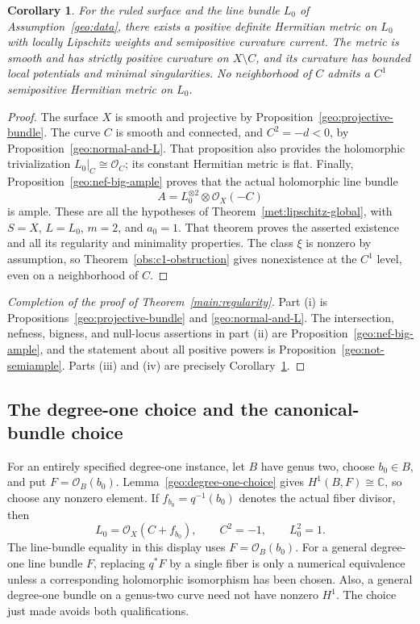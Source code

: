 \documentclass[11pt,a4paper]{article}
\numberwithin{equation}{section}
\newtheorem{corollary}[theorem]{Corollary}
\theoremstyle{definition}
\theoremstyle{remark}
\newcommand{\C}{\mathbb C}
\newcommand{\OO}{\mathcal O}
\begin{document}
\begin{corollary}\label{con:application}
For the ruled surface and the line bundle $L_0$ of
Assumption~\ref{geo:data}, there exists a positive definite Hermitian metric
on $L_0$ with locally Lipschitz weights and semipositive curvature
current. The metric is smooth and has strictly positive curvature
on $X\setminus C$, and its curvature has bounded local potentials
and minimal singularities. No neighborhood of $C$ admits a $C^1$
semipositive Hermitian metric on $L_0$.
\end{corollary}

\begin{proof}
The surface $X$ is smooth and projective by
Proposition~\ref{geo:projective-bundle}. The curve $C$ is smooth and connected,
and $C^2=-d<0$, by Proposition~\ref{geo:normal-and-L}. That proposition also
provides the holomorphic trivialization $L_0|_C\cong\OO_C$; its
constant Hermitian metric is flat. Finally,
Proposition~\ref{geo:nef-big-ample} proves that the actual holomorphic line
bundle
\[
                A=L_0^{\otimes2}\otimes\OO_X(-C)
\]
is ample. These are all the hypotheses of
Theorem~\ref{met:lipschitz-global}, with $S=X$, $L=L_0$, $m=2$, and
$a_0=1$. That theorem proves the asserted existence and all its
regularity and minimality properties. The class $\xi$ is nonzero
by assumption, so Theorem~\ref{obs:c1-obstruction} gives nonexistence at
the $C^1$ level, even on a neighborhood of $C$.
\end{proof}

\begin{proof}[Completion of the proof of Theorem~\ref{main:regularity}]
Part (i) is Propositions~\ref{geo:projective-bundle} and \ref{geo:normal-and-L}.
The intersection, nefness, bigness, and null-locus assertions in
part (ii) are Proposition~\ref{geo:nef-big-ample}, and the statement about all
positive powers is Proposition~\ref{geo:not-semiample}.
Parts (iii) and (iv) are precisely Corollary~\ref{con:application}.
\end{proof}

\subsection{The degree-one choice and the canonical-bundle choice}

For an entirely specified degree-one instance, let $B$ have genus
two, choose $b_0\in B$, and put $F=\OO_B(b_0)$.
Lemma~\ref{geo:degree-one-choice} gives
$H^1(B,F)\cong\C$, so choose any nonzero element. If
$f_{b_0}=q^{-1}(b_0)$ denotes the actual fiber divisor, then
\begin{equation}\label{con:degree-one}
 L_0=\OO_X(C+f_{b_0}),\qquad C^2=-1,\qquad L_0^2=1.
\end{equation}
The line-bundle equality in this display uses $F=\OO_B(b_0)$.
For a general degree-one line bundle $F$, replacing $q^*F$ by a
single fiber is only a numerical equivalence unless a corresponding
holomorphic isomorphism has been chosen. Also, a general degree-one
bundle on a genus-two curve need not have nonzero $H^1$.
The choice just made avoids both qualifications.
\end{document}
